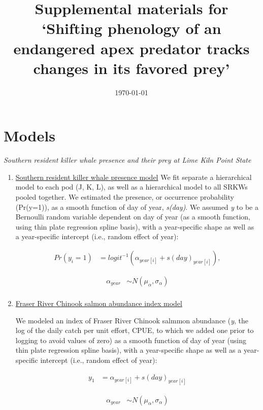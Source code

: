 \documentclass{article}
\begin{document}



\title{Supplemental materials for `Shifting phenology of an endangered apex predator tracks changes in its favored prey'}
\date{\today}
\maketitle
\author{}
\renewcommand{\thetable}{S\arabic{table}}
\renewcommand{\thefigure}{S\arabic{figure}}
\section*{Models}
\emph{Southern resident killer whale presence and their prey at Lime Kiln Point State}
\begin{enumerate}
\item \underline{Southern resident killer whale presence model}
We fit separate a hierarchical model to each pod (J, K, L), as well as a hierarchical model to all SRKWs pooled together. We estimated the presence, or occurrence probability (Pr(y=1)), as a smooth function of day of year, \emph{s(day)}. We assumed \emph{y} to be a Bernoulli random variable dependent on day of year (as a smooth function, using thin plate regression spline basis), with a year-specific shape as well as a year-specific intercept (i.e., random effect of year):


\begin{align*}
Pr(y_i = 1) &= logit^{-1} (\alpha_{year[i]} + s(day)_{year[i]}),
\end{align*}

\begin{align*}
\alpha_{year} & \sim N(\mu_{\alpha}, \sigma_{\alpha}) \\
\end{align*}


\item \underline{Fraser River Chinook salmon abundance index model}

We modeled an index of Fraser River Chinook salmmon abundance (\emph{y}, the log of the daily catch per unit effort, CPUE, to which we added one prior to logging to avoid values of zero) as a smooth function of day of year (using thin plate regression spline basis), with a year-specific shape as well as a year-specific intercept (i.e., random effect of year):


\begin{align*}
y_1 &= \alpha_{year[i]} + s(day)_{year[i]}
\end{align*}

\begin{align*}
\alpha_{year} & \sim N(\mu_{\alpha}, \sigma_{\alpha}) \\
\end{align*}

\end{enumerate}
\end{document}
